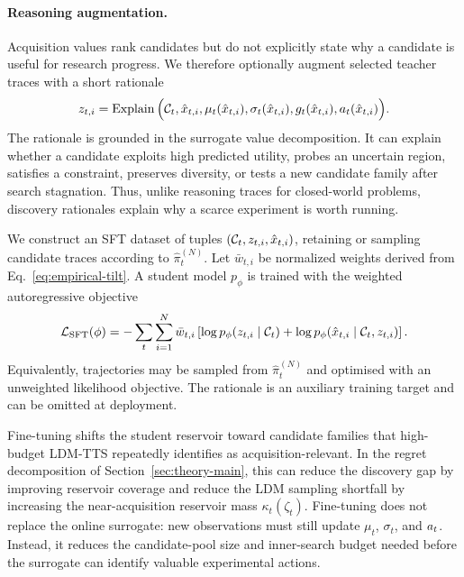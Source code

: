 \paragraph{Reasoning augmentation.}
Acquisition values rank candidates but do not explicitly state why a candidate
is useful for research progress. We therefore optionally augment selected
teacher traces with a short rationale
\begin{equation}
z_{t,i}
=
\operatorname{Explain}\Big(
\mathcal{C}_t,\hat{x}_{t,i},
\mu_t(\hat{x}_{t,i}),
\sigma_t(\hat{x}_{t,i}),
g_t(\hat{x}_{t,i}),
a_t(\hat{x}_{t,i})
\Big).
\label{eq:reasoning-augmentation}
\end{equation}
The rationale is grounded in the surrogate value decomposition. It can explain
whether a candidate exploits high predicted utility, probes an uncertain
region, satisfies a constraint, preserves diversity, or tests a new candidate
family after search stagnation. Thus, unlike reasoning traces for closed-world
problems, discovery rationales explain why a scarce experiment is worth
running.

We construct an SFT dataset of tuples
$(\mathcal{C}_t,z_{t,i},\hat{x}_{t,i})$, retaining or sampling candidate traces
according to $\widehat{\pi}^{(N)}_t$. Let $\bar{w}_{t,i}$ be normalized weights
derived from Eq.~\eqref{eq:empirical-tilt}. A student model $p_\phi$ is trained
with the weighted autoregressive objective
\begin{equation}
\mathcal{L}_{\mathrm{SFT}}(\phi)
=
-
\sum_t\sum_{i=1}^{N}
\bar{w}_{t,i}
\left[
\log p_\phi(z_{t,i}\mid\mathcal{C}_t)
+
\log p_\phi(\hat{x}_{t,i}\mid\mathcal{C}_t,z_{t,i})
\right].
\label{eq:sft-loss}
\end{equation}
Equivalently, trajectories may be sampled from
$\widehat{\pi}^{(N)}_t$ and optimised with an unweighted likelihood objective.
The rationale is an auxiliary training target and can be omitted at
deployment.

Fine-tuning shifts the student reservoir toward candidate families that
high-budget LDM-TTS repeatedly identifies as acquisition-relevant. In the
regret decomposition of Section~\ref{sec:theory-main}, this can reduce the
discovery gap by improving reservoir coverage and reduce the LDM sampling
shortfall by increasing the near-acquisition reservoir mass
$\kappa_t(\zeta_t)$. Fine-tuning does not replace the online surrogate:
new observations must still update $\mu_t$, $\sigma_t$, and $a_t$. Instead,
it reduces the candidate-pool size and inner-search budget needed before the
surrogate can identify valuable experimental actions.